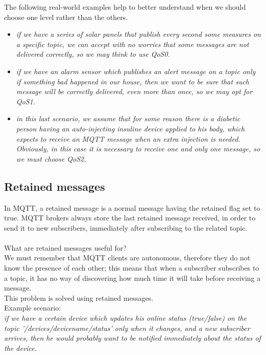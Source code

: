 \documentclass[12pt]{report}
\begin{document}
{\setlength{\parindent}{0cm} {The following real-world examples help to better understand when we should choose one level rather than the others.\\
}

\begin{itemize}
\setlength{\itemindent}{+4mm}
\item \emph{if we have a series of solar panels that publish every second some measures on a specific topic, we can accept with no worries that some messages are not delivered correctly, so we may think to use QoS0.}
\item \emph{if we have an alarm sensor which publishes an alert message on a topic only if something bad happened in our house, then we want to be sure that such message will be correctly delivered, even more than once, so we may opt for QoS1.}
\item \emph{in this last scenario, we assume that for some reason there is a diabetic person having an auto-injecting insuline device applied to his body, which expects to receive an MQTT message when an extra injection is needed.\\Obviously, in this case it is necessary to receive one and only one message, so we must choose QoS2.}
\end{itemize}

\bigskip
\subsection{Retained messages}
\bigskip
In MQTT, a retained message is a normal message having the retained flag set to true.
MQTT brokers always store the last retained message received, in order to send it to new subscribers, immediately after subscribing to the related topic.\\\\
What are retained messages useful for?\\

We must remember that MQTT clients are autonomous, therefore they do not know the presence of each other; this means that when a subscriber subscribes to a topic, it has no way of discovering how much time it will take before receiving a message.\\
This problem is solved using retained messages.\\

Example scenario: \\

\emph{if we have a certain device which updates his online status (true/false) on the topic '/devices/devicename/status' only when it changes, and a new subscriber arrives, then he would probably want to be notified immediately about the status of the device.}

}
\end{document}
